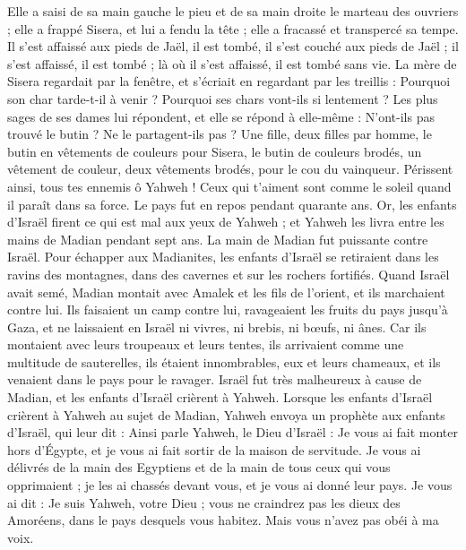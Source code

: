 \begin{multicols}{2}
Elle a saisi de sa main gauche le pieu et de sa main droite le marteau des ouvriers ; elle a frappé Sisera, et lui a fendu la tête ; elle a fracassé et transpercé sa tempe.
Il s'est affaissé aux pieds de Jaël, il est tombé, il s’est couché aux pieds de Jaël ; il s'est affaissé, il est tombé ; là où il s'est affaissé, il est tombé sans vie.
La mère de Sisera regardait par la fenêtre, et s'écriait en regardant par les treillis : Pourquoi son char tarde-t-il à venir ? Pourquoi ses chars vont-ils si lentement ?
Les plus sages de ses dames lui répondent, et elle se répond à elle-même :
N'ont-ils pas trouvé  le butin ? Ne le partagent-ils pas ? Une fille, deux filles par homme, le butin en vêtements de couleurs pour Sisera, le butin de couleurs brodés, un vêtement de couleur, deux vêtements brodés, pour le cou du vainqueur.
Périssent ainsi, tous tes ennemis ô Yahweh ! Ceux qui t'aiment sont comme le soleil quand il paraît dans sa force. Le pays fut en repos pendant quarante ans.
\VerseOne{}Or, les enfants d'Israël firent ce qui est mal aux yeux de  Yahweh ; et Yahweh les livra entre les mains de Madian pendant sept ans.
La main de Madian fut puissante contre Israël. Pour échapper aux Madianites, les enfants d'Israël se retiraient dans les ravins des montagnes, dans des cavernes et sur les rochers fortifiés.
Quand Israël avait semé, Madian montait avec Amalek et les fils de l’orient, et ils marchaient contre lui.
Ils faisaient un camp contre lui, ravageaient les fruits du pays jusqu'à Gaza, et ne laissaient en Israël ni vivres, ni brebis, ni bœufs, ni ânes.
Car ils montaient avec leurs troupeaux et leurs tentes, ils arrivaient comme une multitude de sauterelles, ils étaient innombrables, eux et leurs chameaux, et ils venaient dans le pays pour le ravager.
Israël fut très malheureux à cause de Madian, et les enfants d'Israël crièrent à Yahweh.
Lorsque les enfants d'Israël crièrent à Yahweh au sujet de Madian,
Yahweh envoya un prophète aux enfants d'Israël, qui leur dit : Ainsi parle Yahweh, le Dieu d'Israël : Je vous ai fait monter hors d’Égypte, et je vous ai fait sortir de la maison de servitude.
Je vous ai délivrés de la main des Egyptiens et de la main de tous ceux qui vous opprimaient ; je les ai chassés devant vous, et je vous ai donné leur pays.
Je vous ai dit : Je suis Yahweh, votre Dieu ; vous ne craindrez pas les dieux des Amoréens, dans le pays desquels vous habitez. Mais vous n'avez pas obéi à ma voix.

\end{multicols}
